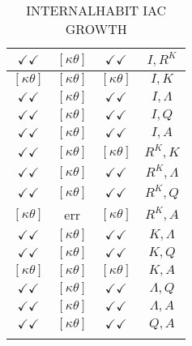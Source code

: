 \documentclass[a4paper,10pt]{article}
\begin{document}
\begin{longtable}{|c|c|c|c|}
\hline
$\checkmark\checkmark$ & $[\kappa \theta ]$ & $\checkmark\checkmark$ & ${I},{R^{K}}$ \\
\hline
$[\kappa \theta ]$ & $[\kappa \theta ]$ & $[\kappa \theta ]$ & ${I},{K}$ \\
\hline
$\checkmark\checkmark$ & $[\kappa \theta ]$ & $\checkmark\checkmark$ & ${I},{\Lambda}$ \\
\hline
$\checkmark\checkmark$ & $[\kappa \theta ]$ & $\checkmark\checkmark$ & ${I},{Q}$ \\
\hline
$\checkmark\checkmark$ & $[\kappa \theta ]$ & $\checkmark\checkmark$ & ${I},{A}$ \\
\hline
$\checkmark\checkmark$ & $[\kappa \theta ]$ & $[\kappa \theta ]$ & ${R^{K}},{K}$ \\
\hline
$\checkmark\checkmark$ & $[\kappa \theta ]$ & $\checkmark\checkmark$ & ${R^{K}},{\Lambda}$ \\
\hline
$\checkmark\checkmark$ & $[\kappa \theta ]$ & $\checkmark\checkmark$ & ${R^{K}},{Q}$ \\
\hline
$[\kappa \theta ]$ & err & $[\kappa \theta ]$ & ${R^{K}},{A}$ \\
\hline
$\checkmark\checkmark$ & $[\kappa \theta ]$ & $\checkmark\checkmark$ & ${K},{\Lambda}$ \\
\hline
$\checkmark\checkmark$ & $[\kappa \theta ]$ & $\checkmark\checkmark$ & ${K},{Q}$ \\
\hline
$[\kappa \theta ]$ & $[\kappa \theta ]$ & $[\kappa \theta ]$ & ${K},{A}$ \\
\hline
$\checkmark\checkmark$ & $[\kappa \theta ]$ & $\checkmark\checkmark$ & ${\Lambda},{Q}$ \\
\hline
$\checkmark\checkmark$ & $[\kappa \theta ]$ & $\checkmark\checkmark$ & ${\Lambda},{A}$ \\
\hline
$\checkmark\checkmark$ & $[\kappa \theta ]$ & $\checkmark\checkmark$ & ${Q},{A}$ \\
\hline
\caption{INTERNALHABIT IAC GROWTH}
\label{table:MyTableLabel}
\end{longtable}
\end{document}
